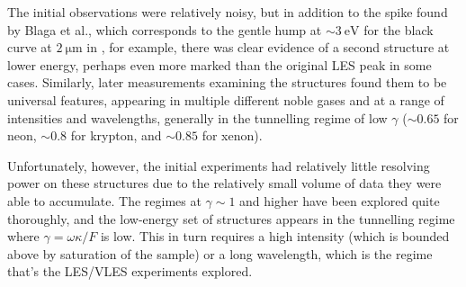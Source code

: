 The initial observations were relatively noisy, but in addition to the spike found by Blaga et al., which corresponds to the gentle hump at ${\sim}\SI{3}{\electronvolt}$ for the black curve at $\SI{2}{\micro\meter}$ in , for example, there was clear evidence of a second structure at lower energy, perhaps even more marked than the original LES peak in some cases. Similarly, later measurements \cite{VLES_characterization} examining the structures found them to be universal features, appearing in multiple different noble gases and at a range of intensities and wavelengths, generally in the tunnelling regime of low $\gamma$ (${\sim}0.65$ for neon, ${\sim}0.8$ for krypton, and ${\sim}0.85$ for xenon).


Unfortunately, however, the initial experiments had relatively little resolving power on these structures due to the relatively small volume of data they were able to accumulate. The regimes at $\gamma \sim 1$ and higher have been explored quite thoroughly, and the low-energy set of structures appears in the tunnelling regime where $\gamma = \omega \kappa / F$ is low. This in turn requires a high intensity (which is bounded above by saturation of the sample) or a long wavelength, which is the regime that's the LES/VLES experiments explored.


